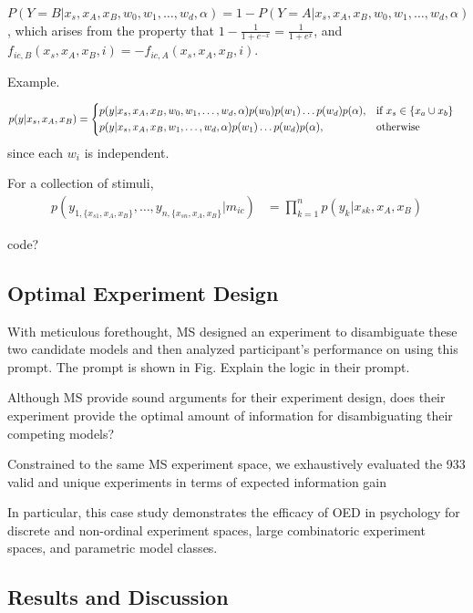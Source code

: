 \documentclass{article}
\begin{document}
$P(Y=B| x_s, x_A, x_B, w_0, w_1, \dots, w_d, \alpha) = 1- P(Y=A| x_s, x_A, x_B, w_0, w_1, \dots, w_d, \alpha)$, which arises from the property that $1-\frac{1}{1+e^{-x}} = \frac{1}{1+e^x}$, and $f_{ic,B}(x_s, x_A, x_B, i) = -f_{ic,A}(x_s, x_A, x_B, i)$.

Example.

\begin{align}
    p(y | x_s, x_A, x_B) &=  
        \begin{dcases}
            p(y|x_s, x_A, x_B, w_0, w_1, \dots, w_d, \alpha) p(w_0) p(w_1) \dots p(w_d) p(\alpha), & \text{if } x_s \in \{x_a \cup x_b\}\\
            p(y|x_s, x_A, x_B, w_1, \dots, w_d, \alpha) p(w_1) \dots p(w_d) p(\alpha), & \text{otherwise}
        \end{dcases}
\end{align}
since each $w_i$ is independent.

For a collection of stimuli, 
\begin{align}
    p(y_{1,\{x_{s1}, x_A, x_B\}}, \dots, y_{n,\{x_{sn}, x_A, x_B\}} | m_{ic}) &=  \prod\limits_{k=1}^n p(y_k|x_{sk}, x_A, x_B) 
\end{align}

code?

\subsection{Optimal Experiment Design}
With meticulous forethought, MS designed an experiment to disambiguate these two candidate models and then analyzed participant's performance on using this prompt. The prompt is shown in Fig. Explain the logic in their prompt.

Although MS provide sound arguments for their experiment design, does their experiment provide the optimal amount of information for disambiguating their competing models?

Constrained to the same MS experiment space, we exhaustively evaluated the 933 valid and unique experiments in terms of expected information gain

In particular, this case study demonstrates the efficacy of OED in psychology for discrete and non-ordinal experiment spaces, large combinatoric experiment spaces, and parametric model classes. 

\subsection{Results and Discussion}
\end{document}
